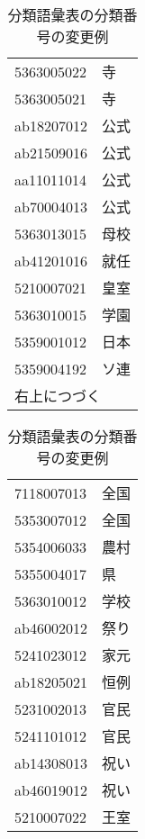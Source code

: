 \begin{enumerate}
\begin{table}[t]
    \caption{分類語彙表の分類番号の変更例}
    \label{tab:code_change_rei}
  \begin{center}
\small\renewcommand{\arraystretch}{}
\begin{tabular}[c]{|ll|}\hline
5363005022 & 寺\\
5363005021 & 寺\\
ab18207012 & 公式\\
ab21509016 & 公式\\
aa11011014 & 公式\\
ab70004013 & 公式\\
5363013015 & 母校\\
ab41201016 & 就任\\
5210007021 & 皇室\\
5363010015 & 学園\\
5359001012 & 日本\\
5359004192 & ソ連\\
\multicolumn{2}{|l|}{右上につづく}\\\hline
\end{tabular}
\begin{tabular}[c]{|ll|}\hline
7118007013 & 全国\\
5353007012 & 全国\\
5354006033 & 農村\\
5355004017 & 県\\
5363010012 & 学校\\
ab46002012 & 祭り\\
5241023012 & 家元\\
ab18205021 & 恒例\\
5231002013 & 官民\\
5241101012 & 官民\\
ab14308013 & 祝い\\
ab46019012 & 祝い\\
5210007022 & 王室\\\hline
\end{tabular}
\end{center}
\end{table}


\end{enumerate}
